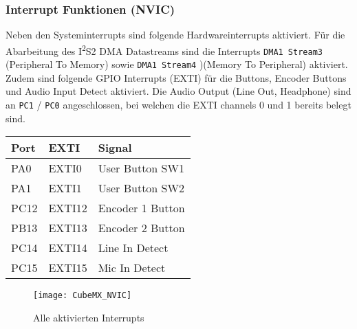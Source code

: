 \subsubsection{Interrupt Funktionen (NVIC)}
\label{sec:CubeMXNVIC}

Neben den Systeminterrupts sind folgende Hardwareinterrupts aktiviert.
Für die Abarbeitung des I\textsuperscript{2}S2 DMA Datastreams sind die Interrupts \texttt{DMA1 Stream3} (Peripheral To Memory) sowie \texttt{DMA1 Stream4} )(Memory To Peripheral) aktiviert.
Zudem sind folgende GPIO Interrupts (EXTI) für die Buttons, Encoder Buttons und Audio Input Detect aktiviert. Die Audio Output (Line Out, Headphone) sind an \texttt{PC1} / \texttt{PC0} angeschlossen, bei welchen die EXTI channels 0 und 1 bereits belegt sind.

\begin{table}[H]
	\centering
	\begin{tabular}{|l|l|l|}
		\hline
		\textbf{Port} & \textbf{EXTI} & \textbf{Signal}  \\ \hline
		PA0           & EXTI0         & User Button SW1  \\ \hline
		PA1           & EXTI1         & User Button SW2  \\ \hline
		PC12          & EXTI12        & Encoder 1 Button \\ \hline
		PB13          & EXTI13        & Encoder 2 Button \\ \hline
		PC14          & EXTI14        & Line In Detect   \\ \hline
		PC15          & EXTI15        & Mic In Detect    \\ \hline
	\end{tabular}
\end{table}

\begin{figure}[H]
	\centering
	\texttt{[image: CubeMX\_NVIC]}
	\caption{Alle aktivierten Interrupts }
	\label{pic:CubeMX_NVIC}
\end{figure}


